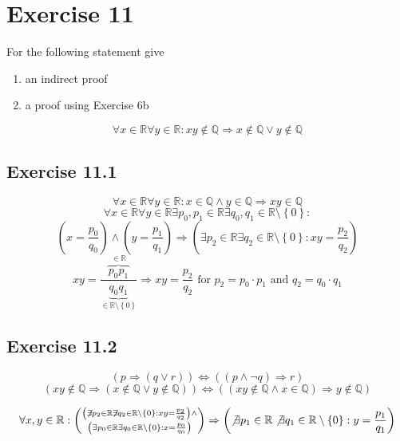 \documentclass[a4paper]{article}
\theoremstyle{definition}
\newcommand\set[1]{\left\{#1\right\}}
\begin{document}
\section{Exercise 11}
\begin{ex}
  For the following statement give
  \begin{enumerate}
    \item an indirect proof
    \item a proof using Exercise 6b
  \end{enumerate}
  \[
      \forall x \in \mathbb R \forall y \in \mathbb R:
      xy \not\in \mathbb Q \Rightarrow x \not\in \mathbb Q \lor y \not\in \mathbb Q
  \]
\end{ex}

\subsection{Exercise 11.1}
\[ \forall x \in \mathbb R \forall y \in \mathbb R: x \in \mathbb Q \land y \in \mathbb Q \Rightarrow xy \in \mathbb Q \]
\[ \forall x \in \mathbb R \forall y \in \mathbb R \exists p_0, p_1 \in \mathbb R \exists q_0, q_1 \in \mathbb R \setminus \set{0}: \]
\[
    \left(x = \frac{p_0}{q_0}\right) \land \left(y = \frac{p_1}{q_1}\right)
    \Rightarrow \left(\exists p_2 \in \mathbb R \exists q_2 \in \mathbb R \setminus \set{0}: xy = \frac{p_2}{q_2} \right)
\] \[
    xy = \frac{\overbrace{p_0 p_1}^{\in \mathbb R}}{\underbrace{q_0 q_1}_{\in \mathbb R \setminus \set{0}}}
    \Rightarrow xy = \frac{p_2}{q_2} \text{ for } p_2 = p_0 \cdot p_1 \text{ and } q_2 = q_0 \cdot q_1
\]

\subsection{Exercise 11.2}
\[ (p \Rightarrow (q \lor r)) \Leftrightarrow ((p \land \neg q) \Rightarrow r) \]
\[
    (xy \not\in \mathbb Q \Rightarrow \left(x \not\in \mathbb Q \lor y \not\in \mathbb Q\right)) \Leftrightarrow
    ((xy \not\in \mathbb Q \land x \in \mathbb Q) \Rightarrow y \not\in \mathbb Q)
\]

\[
    \forall x,y \in \mathbb R: \left(
      \substack{
      \left(\not\exists p_2 \in \mathbb R \not\exists q_2 \in \mathbb R \setminus \set{0}: xy = \frac{p_2}{q_2}\right) \land \\
      \left(\exists p_0 \in \mathbb R \exists q_0 \in \mathbb R \setminus \set{0}: x = \frac{p_0}{q_0}\right)}
    \right) \Rightarrow \left(\not\exists p_1 \in \mathbb R \not\exists q_1 \in \mathbb R \setminus \set{0}: y = \frac{p_1}{q_1}\right)
\]
\end{document}
